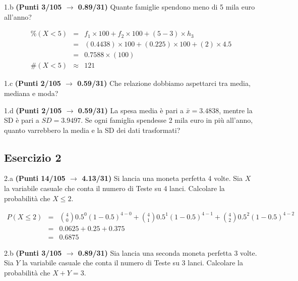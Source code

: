 \documentclass[
  11pt,
]{book}
\theoremstyle{mytheoremstyle}
\theoremstyle{mydefstyle}
\newenvironment{sol}
  {
  \begin{tcolorbox}[enhanced,breakable,arc=0.1mm,boxrule=1pt,colback=white,colframe=iblue,
  title=\bf \fontfamily{lmss}\selectfont \hspace{.5 cm} Soluzione,drop fuzzy shadow]

}{
\end{tcolorbox}
  }
\begin{document}
1.b \textbf{(Punti 3/105 \(\rightarrow\) 0.89/31)} Quante famiglie spendono meno di 5 mila euro all'anno?

\begin{sol}
\begin{eqnarray*}
     \%(X< 5 ) &=&  f_{ 1 }\times 100+f_{ 2 }\times 100 +( 5 - 3 )\times h_{ 3 } \\
              &=&  ( 0.4438 )\times 100+( 0.225 )\times 100 +( 2 )\times  4.5  \\
              &=&  0.7588 \times(100) \\
     \#(X< 5 ) &\approx& 121 
         \end{eqnarray*}

\end{sol}

1.c \textbf{(Punti 2/105 \(\rightarrow\) 0.59/31)} Che relazione dobbiamo aspettarci tra media, mediana e moda?

1.d \textbf{(Punti 2/105 \(\rightarrow\) 0.59/31)} La spesa media è pari a \(\bar x=3.4838\), mentre la SD è pari a \(SD=3.9497\).
Se ogni famiglia spendesse 2 mila euro in più all'anno, quanto varrebbero la media e la SD dei dati trasformati?

\subsection{Esercizio 2}\label{esercizio-2-35}

2.a \textbf{(Punti 14/105 \(\rightarrow\) 4.13/31)} Si lancia una moneta perfetta 4 volte. Sia \(X\) la variabile casuale che conta il numero di Teste su 4 lanci. Calcolare la probabilità che \(X\leq 2\).

\begin{sol}
\normalsize 
\begin{eqnarray*}
      P( X \leq 2 ) &=& \binom{ 4 }{ 0 } 0.5 ^{ 0 }(1- 0.5 )^{ 4 - 0 }+\binom{ 4 }{ 1 } 0.5 ^{ 1 }(1- 0.5 )^{ 4 - 1 }+\binom{ 4 }{ 2 } 0.5 ^{ 2 }(1- 0.5 )^{ 4 - 2 } \\                 &=& 0.0625+0.25+0.375 \\                 &=& 0.6875 
   \end{eqnarray*}
\normalsize 

\end{sol}

2.b \textbf{(Punti 3/105 \(\rightarrow\) 0.89/31)} Sia lancia una seconda moneta perfetta 3 volte. Sia \(Y\) la variabile casuale che conta il numero di Teste su 3 lanci. Calcolare la probabilità che \(X+Y=3\).
\end{document}
